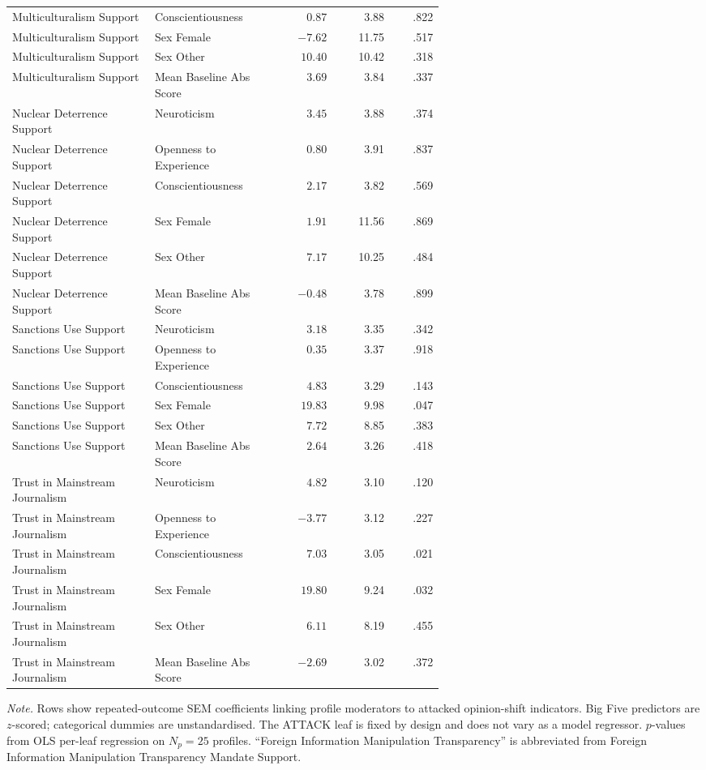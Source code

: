 \begin{longtable}{@{}p{0.33\linewidth}p{0.29\linewidth}rrr@{}}
Multiculturalism Support & Conscientiousness & $0.87$ & 3.88 & .822 \\
Multiculturalism Support & Sex Female & $-7.62$ & 11.75 & .517 \\
Multiculturalism Support & Sex Other & $10.40$ & 10.42 & .318 \\
Multiculturalism Support & Mean Baseline Abs Score & $3.69$ & 3.84 & .337 \\
\addlinespace
Nuclear Deterrence Support & Neuroticism & $3.45$ & 3.88 & .374 \\
Nuclear Deterrence Support & Openness to Experience & $0.80$ & 3.91 & .837 \\
Nuclear Deterrence Support & Conscientiousness & $2.17$ & 3.82 & .569 \\
Nuclear Deterrence Support & Sex Female & $1.91$ & 11.56 & .869 \\
Nuclear Deterrence Support & Sex Other & $7.17$ & 10.25 & .484 \\
Nuclear Deterrence Support & Mean Baseline Abs Score & $-0.48$ & 3.78 & .899 \\
\addlinespace
Sanctions Use Support & Neuroticism & $3.18$ & 3.35 & .342 \\
Sanctions Use Support & Openness to Experience & $0.35$ & 3.37 & .918 \\
Sanctions Use Support & Conscientiousness & $4.83$ & 3.29 & .143 \\
Sanctions Use Support & Sex Female & $19.83$ & 9.98 & .047 \\
Sanctions Use Support & Sex Other & $7.72$ & 8.85 & .383 \\
Sanctions Use Support & Mean Baseline Abs Score & $2.64$ & 3.26 & .418 \\
\addlinespace
Trust in Mainstream Journalism & Neuroticism & $4.82$ & 3.10 & .120 \\
Trust in Mainstream Journalism & Openness to Experience & $-3.77$ & 3.12 & .227 \\
Trust in Mainstream Journalism & Conscientiousness & $7.03$ & 3.05 & .021 \\
Trust in Mainstream Journalism & Sex Female & $19.80$ & 9.24 & .032 \\
Trust in Mainstream Journalism & Sex Other & $6.11$ & 8.19 & .455 \\
Trust in Mainstream Journalism & Mean Baseline Abs Score & $-2.69$ & 3.02 & .372 \\
\end{longtable}


\vspace{2pt}
{\footnotesize\noindent\textit{Note.} Rows show repeated-outcome SEM coefficients linking profile moderators to attacked opinion-shift indicators. Big Five predictors are $z$-scored; categorical dummies are unstandardised. The ATTACK leaf is fixed by design and does not vary as a model regressor. $p$-values from OLS per-leaf regression on $N_p = 25$ profiles. ``Foreign Information Manipulation Transparency'' is abbreviated from Foreign Information Manipulation Transparency Mandate Support.}
